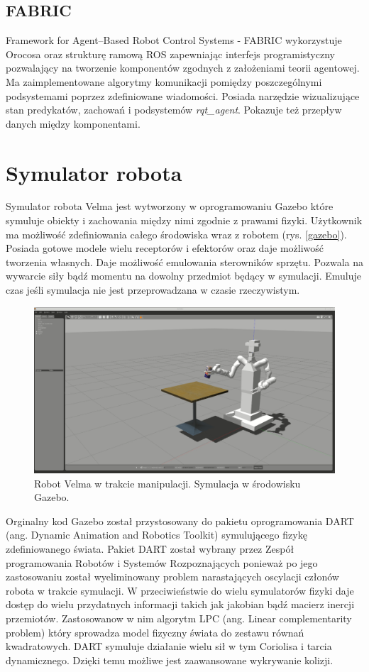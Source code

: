 	\subsection{FABRIC}
	Framework for Agent–Based Robot Control Systems - FABRIC\cite{bib:fabric} wykorzystuje Orocosa oraz strukturę ramową ROS zapewniając interfejs programistyczny pozwalający na tworzenie komponentów zgodnych z założeniami teorii agentowej. Ma zaimplementowane algorytmy komunikacji pomiędzy poszczególnymi podsystemami poprzez zdefiniowane wiadomości. Posiada narzędzie wizualizujące stan predykatów, zachowań i podsystemów \textit{rqt\_agent}\cite{bib:rqtAgent}. Pokazuje też przepływ danych między komponentami.

	
	\section{Symulator robota}
	Symulator robota Velma jest wytworzony w oprogramowaniu Gazebo \cite{bib:Gazebo} które symuluje obiekty i zachowania między nimi zgodnie z prawami fizyki. Użytkownik ma możliwość zdefiniowania całego środowiska wraz z robotem (rys. \ref{gazebo}). Posiada gotowe modele wielu receptorów i efektorów oraz daje możliwość tworzenia własnych. Daje możliwość emulowania sterowników sprzętu. Pozwala na wywarcie siły bądź momentu na dowolny przedmiot będący w symulacji. Emuluje czas jeśli symulacja nie jest przeprowadzana w czasie rzeczywistym.
	
	\begin{figure}
		\centering
		\includegraphics[width=.6\textwidth]{images/gazebo.png}
		\caption{Robot Velma w trakcie manipulacji. Symulacja w środowisku Gazebo.}
		\label{fig:gazebo}
	\end{figure}

	Orginalny kod Gazebo został przystosowany do pakietu oprogramowania DART (ang. Dynamic Animation and Robotics Toolkit) \cite{bib:dart} symulującego fizykę zdefiniowanego świata. Pakiet DART został wybrany przez Zespół programowania Robotów i Systemów Rozpoznających ponieważ po jego zastosowaniu został wyeliminowany problem narastających oscylacji członów robota w trakcie symulacji. W przeciwieństwie do wielu symulatorów fizyki daje dostęp do wielu przydatnych informacji takich jak jakobian bądź macierz inercji przemiotów. Zastosowanow w nim algorytm LPC (ang. Linear complementarity problem) \cite{bib:lpcBase} który sprowadza model fizyczny świata do zestawu równań kwadratowych. DART symuluje działanie wielu sił w tym Coriolisa i tarcia dynamicznego. Dzięki temu możliwe jest zaawansowane wykrywanie kolizji. 
	
